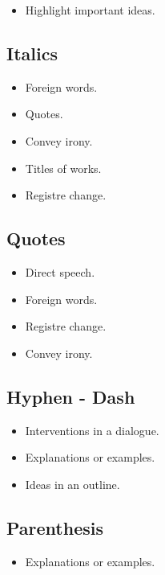 \documentclass{article}
\begin{document}
\begin{itemize}
    \item Highlight important ideas.
\end{itemize}

\subsection*{Italics}

\begin{itemize}
    \item Foreign words.
    \item Quotes.
    \item Convey irony.
    \item Titles of works.
    \item Registre change.
\end{itemize}

\subsection*{Quotes}

\begin{itemize}
    \item Direct speech.
    \item Foreign words.
    \item Registre change.
    \item Convey irony.
\end{itemize}

\subsection*{Hyphen - Dash}

\begin{itemize}
    \item Interventions in a dialogue.
    \item Explanations or examples.
    \item Ideas in an outline.
\end{itemize}

\subsection*{Parenthesis}

\begin{itemize}
    \item Explanations or examples.
\end{itemize}
\end{document}
